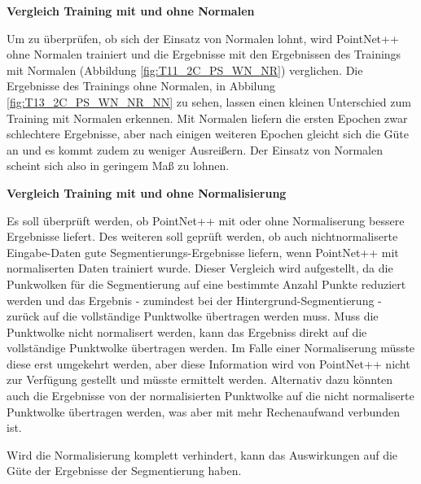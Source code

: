 \documentclass[12pt,titlepage, twoside]{article}
\begin{document}
\textbf{Vergleich Training mit und ohne Normalen}

Um zu überprüfen, ob sich der Einsatz von Normalen lohnt, wird PointNet++ ohne Normalen trainiert und die Ergebnisse mit den Ergebnissen des Trainings mit Normalen (Abbildung \ref{fig:T11_2C_PS_WN_NR}) verglichen. 
Die Ergebnisse des Trainings ohne Normalen, in Abbilung \ref{fig:T13_2C_PS_WN_NR_NN} zu sehen, lassen einen kleinen Unterschied zum Training mit Normalen erkennen. 
Mit Normalen liefern die ersten Epochen zwar schlechtere Ergebnisse, aber nach einigen weiteren Epochen gleicht sich die Güte an und es kommt zudem zu weniger Ausreißern. 
Der Einsatz von Normalen scheint sich also in geringem Maß zu lohnen. 

\textbf{Vergleich Training mit und ohne Normalisierung} 

Es soll überprüft werden, ob PointNet++ mit oder ohne Normaliserung bessere Ergebnisse liefert. 
Des weiteren soll geprüft werden, ob auch nichtnormaliserte Eingabe-Daten gute Segmentierungs-Ergebnisse liefern, wenn PointNet++ mit normaliserten Daten trainiert wurde.
Dieser Vergleich wird aufgestellt, da die Punkwolken für die Segmentierung auf eine bestimmte Anzahl Punkte reduziert werden und das Ergebnis - zumindest bei der Hintergrund-Segmentierung - 
zurück auf die vollständige Punktwolke übertragen werden muss.
Muss die Punktwolke nicht normalisert werden, kann das Ergebniss direkt auf die vollständige Punktwolke übertragen werden. 
Im Falle einer Normaliserung müsste diese erst umgekehrt werden, aber diese Information wird von PointNet++ nicht zur Verfügung gestellt und müsste ermittelt werden.
Alternativ dazu könnten auch die Ergebnisse von der normalisierten Punktwolke auf die nicht normaliserte Punktwolke übertragen werden, was aber mit mehr Rechenaufwand verbunden ist.

Wird die Normalisierung komplett verhindert, kann das Auswirkungen auf die Güte der Ergebnisse der Segmentierung haben.
\end{document}
